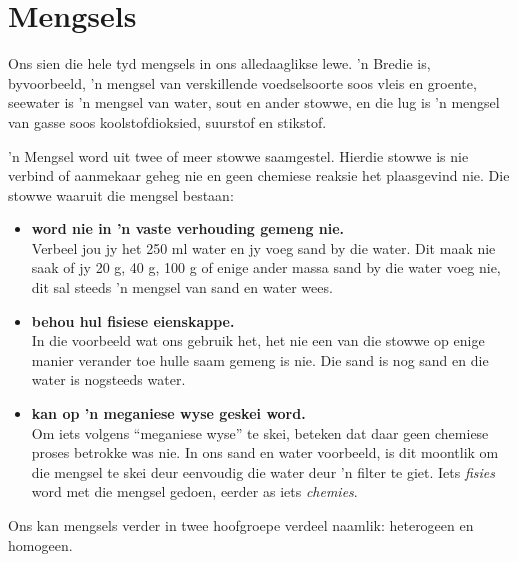             \section{Mengsels}
            \nopagebreak
            \label{m38708*id62584}Ons sien die hele tyd mengsels in ons alledaaglikse lewe. 'n Bredie is, byvoorbeeld, 'n mengsel van verskillende voedselsoorte soos vleis en groente, seewater is 'n mengsel van water, sout en ander stowwe, en die lug is 'n mengsel van gasse soos koolstofdioksied, suurstof en stikstof.\par 
\label{m38708*fhsst!!!underscore!!!id69}
 {\label{m38708*meaningfhsst!!!underscore!!!id69}
      'n Mengsel word uit twee of meer stowwe saamgestel. Hierdie stowwe is nie verbind of aanmekaar geheg nie en geen chemiese reaksie het plaasgevind nie.
       } 
      \label{m38708*id62612}Die stowwe waaruit die mengsel bestaan:\par 
      \label{m38708*id62615}\begin{itemize}[noitemsep]
            \label{m38708*uid2}\item \textbf{word nie in 'n vaste verhouding gemeng nie.} \\
Verbeel jou jy het 250 ml water en jy voeg sand by die water. Dit maak nie saak of jy 20 g, 40 g, 100 g of enige ander massa sand by die water voeg nie, dit sal steeds 'n mengsel van sand en water wees.
\label{m38708*uid3}\item \textbf{behou hul fisiese eienskappe.} \\
In die voorbeeld wat ons gebruik het, het nie een van die stowwe op enige manier verander toe hulle saam gemeng is nie. Die sand is nog sand en die water is nogsteeds water.
\label{m38708*uid4}\item \textbf{kan op 'n meganiese wyse geskei word.} \\
Om iets volgens ``meganiese wyse'' te skei, beteken dat daar geen chemiese proses betrokke was nie. In ons sand en water voorbeeld, is dit moontlik om die mengsel te skei deur eenvoudig die water deur 'n filter te giet. Iets \textsl{fisies} word met die mengsel gedoen, eerder as iets \textsl{chemies}.
\end{itemize}
      \label{m38708*id62700}Ons kan mengsels verder in twee hoofgroepe verdeel naamlik: heterogeen en homogeen.\par 

      \label{m38708*uid5}

